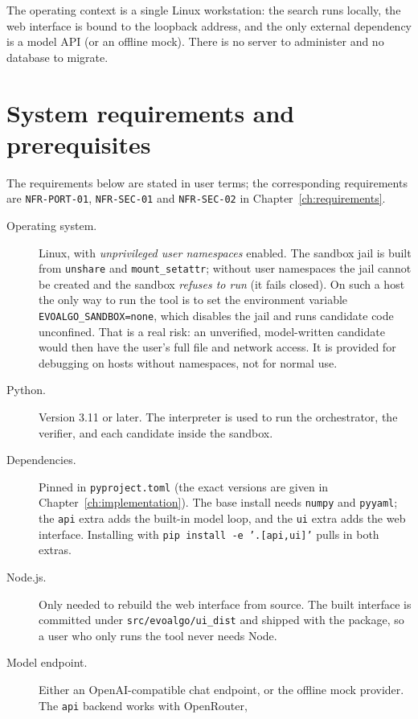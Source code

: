 The operating context is a single Linux workstation: the search runs locally,
the web interface is bound to the loopback address, and the only external
dependency is a model API (or an offline mock). There is no server to administer
and no database to migrate.

\section{System requirements and prerequisites}
\label{sec:ud-requirements}

The requirements below are stated in user terms; the corresponding
requirements are \texttt{NFR-PORT-01}, \texttt{NFR-SEC-01} and
\texttt{NFR-SEC-02} in Chapter~\ref{ch:requirements}.

\begin{description}
  \item[Operating system.] Linux, with \emph{unprivileged user namespaces}
  enabled. The sandbox jail is built from \texttt{unshare} and
  \texttt{mount\_setattr}; without user namespaces the jail cannot be created
  and the sandbox \emph{refuses to run} (it fails closed). On such a host the
  only way to run the tool is to set the environment variable
  \texttt{EVOALGO\_SANDBOX=none}, which disables the jail and runs candidate
  code unconfined. That is a real risk: an unverified, model-written candidate
  would then have the user's full file and network access. It is provided for
  debugging on hosts without namespaces, not for normal use.
  \item[Python.] Version 3.11 or later. The interpreter is used to run the
  orchestrator, the verifier, and each candidate inside the sandbox.
  \item[Dependencies.] Pinned in \texttt{pyproject.toml} (the exact versions
  are given in Chapter~\ref{ch:implementation}). The base install needs
  \texttt{numpy} and \texttt{pyyaml}; the \texttt{api} extra adds the built-in
  model loop, and the \texttt{ui} extra adds the web interface. Installing with
  \texttt{pip install -e '.[api,ui]'} pulls in both extras.
  \item[Node.js.] Only needed to rebuild the web interface from source. The
  built interface is committed under \texttt{src/evoalgo/ui\_dist} and shipped
  with the package, so a user who only runs the tool never needs Node.
   \item[Model endpoint.] Either an OpenAI-compatible chat endpoint, or the
   offline mock provider. The \texttt{api} backend works with OpenRouter,

\end{description}
